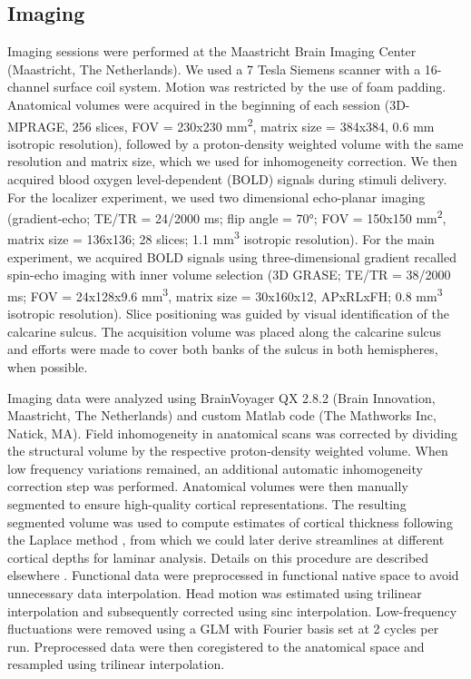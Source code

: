 \subsection{Imaging}
Imaging sessions were performed at the Maastricht Brain Imaging Center (Maastricht, The Netherlands). We used a 7 Tesla Siemens scanner with a 16-channel surface coil system. Motion was restricted by the use of foam padding. Anatomical volumes were acquired in the beginning of each session (3D-MPRAGE, 256 slices, FOV = 230x230 mm\textsuperscript{2}, matrix size = 384x384, 0.6 mm isotropic resolution), followed by a proton-density weighted volume with the same resolution and matrix size, which we used for inhomogeneity correction. We then acquired blood oxygen level-dependent (BOLD) signals during stimuli delivery. For the localizer experiment, we used two dimensional echo-planar imaging (gradient-echo; TE/TR = 24/2000 ms; flip angle = \ang{70}; FOV = 150x150 mm\textsuperscript{2}, matrix size = 136x136; 28 slices; 1.1 mm\textsuperscript{3} isotropic resolution). For the main experiment, we acquired BOLD signals using three-dimensional gradient recalled spin-echo imaging with inner volume selection (3D GRASE; TE/TR = 38/2000 ms; FOV = 24x128x9.6 mm\textsuperscript{3}, matrix size = 30x160x12, APxRLxFH; 0.8 mm\textsuperscript{3} isotropic resolution). Slice positioning was guided by visual identification of the calcarine sulcus. The acquisition volume was placed along the calcarine sulcus and efforts were made to cover both banks of the sulcus in both hemispheres, when possible.

Imaging data were analyzed using BrainVoyager QX 2.8.2 (Brain Innovation, Maastricht, The Netherlands) and custom Matlab code (The Mathworks Inc, Natick, MA). Field inhomogeneity in anatomical scans was corrected by dividing the structural volume by the respective proton-density weighted volume. When low frequency variations remained, an additional automatic inhomogeneity correction step was performed. Anatomical volumes were then manually segmented to ensure high-quality cortical representations. The resulting segmented volume was used to compute estimates of cortical thickness following the Laplace method \cite{Jones:2000cr}, from which we could later derive streamlines at different cortical depths for laminar analysis. Details on this procedure are described elsewhere \cite{Zimmermann:2011kl}. Functional data were preprocessed in functional native space to avoid unnecessary data interpolation. Head motion was estimated using trilinear interpolation and subsequently corrected using sinc interpolation. Low-frequency fluctuations were removed using a GLM with Fourier basis set at 2 cycles per run. Preprocessed data were then coregistered to the anatomical space and resampled using trilinear interpolation.

